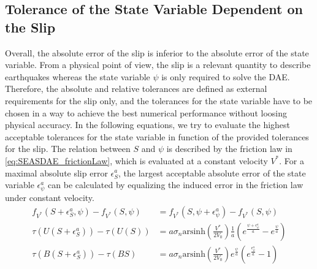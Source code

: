 \subsection{Tolerance of the State Variable Dependent on the Slip}
Overall, the absolute error of the slip is inferior to the absolute error of the state variable. From a physical point of view, the slip is a relevant quantity to describe earthquakes whereas the state variable $\psi$ is only required to solve the DAE. Therefore, the absolute and relative tolerances are defined as external requirements for the slip only, and the tolerances for the state variable have to be chosen in a way to achieve the best numerical performance without loosing physical accuracy. In the following equations, we try to evaluate the highest acceptable tolerances for the state variable in function of the provided tolerances for the slip. The relation between $S$ and $\psi$ is described by the friction law in \autoref{eq:SEASDAE_frictionLaw}, which is evaluated at a constant velocity $V^*$. For a maximal absolute slip error $\epsilon_S^a$, the largest acceptable absolute error of the state variable $\epsilon_\psi^a$ can be calculated by equalizing the induced error in the friction law under constant velocity. 
\begin{align}
    f_{V^*}(S+\epsilon_S^a,\psi) - f_{V^*}(S,\psi) &= f_{V^*}(S,\psi+\epsilon_\psi^a) - f_{V^*}(S,\psi) \\
    \tau(U(S+\epsilon_S^a)) - \tau(U(S)) &= a \sigma_n \text{arsinh}\left(\frac{V^*}{2V_0}\right)\frac{1}{a}\left(e^{\frac{\psi+\epsilon_\psi^a}{a}} - e^{\frac{\psi}{a}}\right) \\
    \tau(B(S+\epsilon_S^a)) - \tau(BS) &= a \sigma_n \text{arsinh}\left(\frac{V^*}{2V_0}\right) e^{\frac{\psi}{a}}\left(e^{\frac{\epsilon_\psi^a}{a}} - 1\right)
\end{align}

